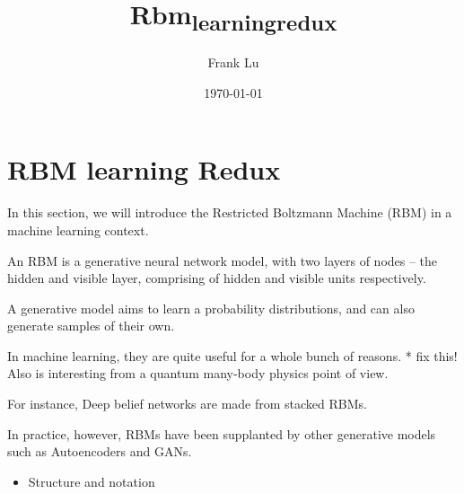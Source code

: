 \documentclass[11pt]{article}
\author{Frank Lu}
\date{\today}
\title{Rbm\textsubscript{learning}\textsubscript{redux}}
\begin{document}
\maketitle
\tableofcontents

\newcommand{\kp}{\ket{\psi}}
\newcommand{\bp}{\bra{\psi}}
\newcommand{\tr}[1]{\textrm{tr}\left[{#1}\right]}
\newcommand{\U}{\mathcal{U}}

\newsavebox{\mybox}
\newenvironment{Notes}
{\begin{lrbox}{\mybox}\begin{minipage}{\textwidth}}
{\end{minipage}\end{lrbox}\fbox{\usebox{\mybox}}\\}


\newcommand{\nH}{n_H}
\newcommand{\nV}{n_V}
\newcommand{\NH}{N_H}
\newcommand{\NV}{N_V}

\newcommand{\ls}{l_1l_2 \dots l_{\nH}}
\newcommand{\ones}{1, 1, \dots, 1}
\newcommand{\ks}{k_1k_2 \dots k_{\nH}}

\newcommand{\R}{\mathbb{R}}


\newcommand\xv{\mathbf{x}}
\newcommand\hv{\mathbf{h}}
\newcommand\vv{\mathbf{v}}
\newcommand\rbm{\text{RBM}}


\section{RBM learning Redux}
\label{sec:org8b5b42a}
In this section, we will introduce the Restricted Boltzmann Machine (RBM) in a machine learning context.

An RBM is a generative neural network model, with two layers of nodes -- the hidden and visible layer, comprising of hidden and visible units respectively.

A generative model aims to learn a probability distributions, and can also generate samples of their own.


In machine learning, they are quite useful for a whole bunch of reasons. * fix this!
Also is interesting from a quantum many-body physics point of view.

For instance, Deep belief networks are made from stacked RBMs.

In practice, however, RBMs have been supplanted by other generative models such as Autoencoders and GANs.

\begin{itemize}
\item Structure and notation
\end{itemize}
\end{document}
